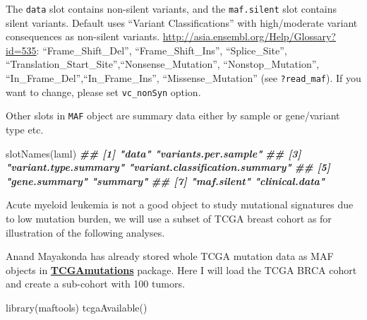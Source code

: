 \documentclass[
  12pt,
  a4paper,
  twoside]{book}
\newenvironment{Shaded}{\begin{snugshade}}{\end{snugshade}}
\newcommand{\AttributeTok}[1]{\textcolor[rgb]{0.77,0.63,0.00}{#1}}
\newcommand{\CommentTok}[1]{\textcolor[rgb]{0.56,0.35,0.01}{\textit{#1}}}
\newcommand{\DecValTok}[1]{\textcolor[rgb]{0.00,0.00,0.81}{#1}}
\newcommand{\DocumentationTok}[1]{\textcolor[rgb]{0.56,0.35,0.01}{\textbf{\textit{#1}}}}
\newcommand{\FunctionTok}[1]{\textcolor[rgb]{0.00,0.00,0.00}{#1}}
\newcommand{\NormalTok}[1]{#1}
\newcommand{\OtherTok}[1]{\textcolor[rgb]{0.56,0.35,0.01}{#1}}
\newcommand{\SpecialCharTok}[1]{\textcolor[rgb]{0.00,0.00,0.00}{#1}}
\newcommand{\StringTok}[1]{\textcolor[rgb]{0.31,0.60,0.02}{#1}}
\begin{document}
The \texttt{data} slot contains non-silent variants, and the \texttt{maf.silent} slot contains silent variants.
Default uses ``Variant Classifications'' with high/moderate variant consequences as non-silent variants. \url{http://asia.ensembl.org/Help/Glossary?id=535}: ``Frame\_Shift\_Del'', ``Frame\_Shift\_Ins'', ``Splice\_Site'', ``Translation\_Start\_Site'',``Nonsense\_Mutation'', ``Nonstop\_Mutation'', ``In\_Frame\_Del'',``In\_Frame\_Ins'', ``Missense\_Mutation'' (see \texttt{?read\_maf}). If you want to change, please set \texttt{vc\_nonSyn} option.

Other slots in \texttt{MAF} object are summary data either by sample or gene/variant type etc.

\begin{Shaded}
\begin{Highlighting}[]
\FunctionTok{slotNames}\NormalTok{(laml)}
\DocumentationTok{\#\# [1] "data"                           "variants.per.sample"           }
\DocumentationTok{\#\# [3] "variant.type.summary"           "variant.classification.summary"}
\DocumentationTok{\#\# [5] "gene.summary"                   "summary"                       }
\DocumentationTok{\#\# [7] "maf.silent"                     "clinical.data"}
\end{Highlighting}
\end{Shaded}

Acute myeloid leukemia is not a good object to study mutational signatures due to low mutation burden, we will use a subset of TCGA breast cohort as for illustration of the following analyses.

Anand Mayakonda has already stored whole TCGA mutation data as MAF objects in \href{https://github.com/PoisonAlien/TCGAmutations}{\textbf{TCGAmutations}} package.
Here I will load the TCGA BRCA cohort and create a sub-cohort with 100 tumors.

\begin{Shaded}
\begin{Highlighting}[]
\FunctionTok{library}\NormalTok{(maftools)}
\FunctionTok{tcgaAvailable}\NormalTok{()}
\end{Highlighting}
\end{Shaded}

\begin{Shaded}
\end{Shaded}
\end{document}
